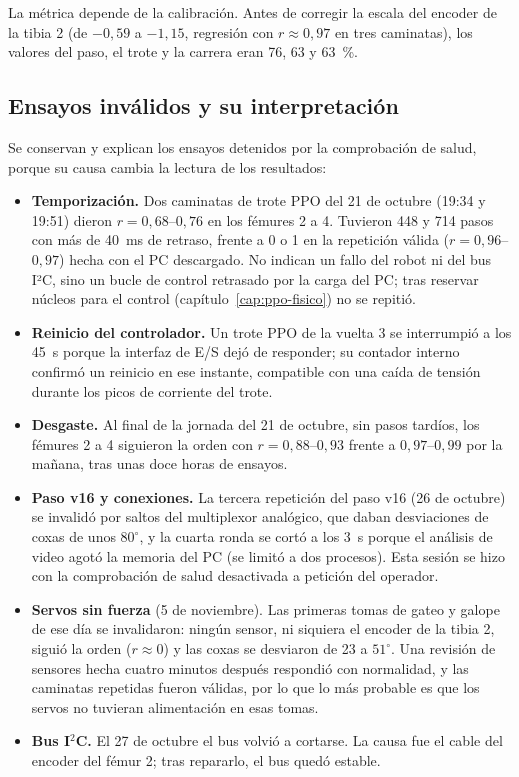 La métrica depende de la calibración. Antes de corregir la escala del encoder de la
tibia 2 (de $-0{,}59$ a $-1{,}15$, regresión con $r\approx0{,}97$ en tres
caminatas), los valores del paso, el trote y la carrera eran 76, 63 y 63~\%.

\subsection{Ensayos inválidos y su interpretación}

Se conservan y explican los ensayos detenidos por la comprobación de salud,
porque su causa cambia la lectura de los resultados:
\begin{itemize}
    \item \textbf{Temporización.} Dos caminatas de trote PPO del 21 de octubre
    (19:34 y 19:51) dieron $r=0{,}68$--$0{,}76$ en los fémures 2 a 4. Tuvieron
    448 y 714 pasos con más de 40~ms de retraso, frente a 0 o 1 en la
    repetición válida ($r=0{,}96$--$0{,}97$) hecha con el PC descargado. No
    indican un fallo del robot ni del bus I²C, sino un bucle de control
    retrasado por la carga del PC; tras reservar núcleos para el control
    (capítulo~\ref{cap:ppo-fisico}) no se repitió.
    \item \textbf{Reinicio del controlador.} Un trote PPO de la vuelta 3 se
    interrumpió a los 45~s porque la interfaz de E/S dejó de responder; su contador
    interno confirmó un reinicio en ese instante, compatible con una caída de
    tensión durante los picos de corriente del trote.
    \item \textbf{Desgaste.} Al final de la jornada del 21 de octubre, sin pasos
    tardíos, los fémures 2 a 4 siguieron la orden con $r=0{,}88$--$0{,}93$
    frente a $0{,}97$--$0{,}99$ por la mañana, tras unas doce horas de
    ensayos.
    \item \textbf{Paso v16 y conexiones.} La tercera repetición del paso v16
    (26 de octubre) se invalidó por saltos del multiplexor analógico, que daban
    desviaciones de coxas de unos $80^\circ$, y la cuarta ronda se cortó a los
    3~s porque el análisis de video agotó la memoria del PC (se limitó a dos
    procesos). Esta sesión se hizo con la comprobación de salud desactivada a
    petición del operador.
    \item \textbf{Servos sin fuerza} (5 de noviembre). Las primeras tomas de gateo y
    galope de ese día se invalidaron: ningún sensor, ni siquiera el encoder de la tibia 2,
    siguió la orden ($r\approx0$) y las coxas se desviaron de 23 a $51^\circ$. Una
    revisión de sensores hecha cuatro minutos después respondió con normalidad, y las
    caminatas repetidas fueron válidas, por lo que lo más probable es que los servos no
    tuvieran alimentación en esas tomas.
    \item \textbf{Bus I$^2$C.} El 27 de octubre el bus volvió a cortarse. La causa
    fue el cable del encoder del fémur 2; tras repararlo, el bus quedó estable.
\end{itemize}

